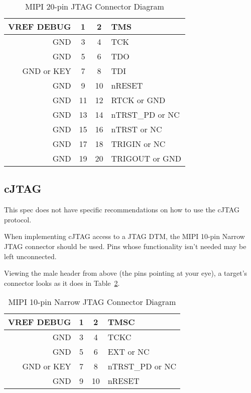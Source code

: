 \begin{table}[H]
    \centering
    \caption{MIPI 20-pin JTAG Connector Diagram}
    \label{tab:mipitwenty}
    \begin{tabular}{|r|c|c|l|}
        \hline
        VREF DEBUG & 1 & 2 & TMS \\
        \hline
        GND & 3 & 4 & TCK \\
        \hline
        GND & 5 & 6 & TDO \\
        \hline
        GND or KEY & 7 & 8 & TDI \\
        \hline
        GND & 9 & 10 & nRESET \\
        \hline
        GND & 11 & 12 & RTCK or GND \\
        \hline
        GND & 13 & 14 & nTRST\_PD or NC \\
        \hline
        GND & 15 & 16 & nTRST or NC \\
        \hline
        GND & 17 & 18 & TRIGIN or NC \\
        \hline
        GND & 19 & 20 & TRIGOUT or GND \\
        \hline
    \end{tabular}
\end{table}

\subsection{cJTAG}

This spec does not have specific recommendations on how to use the cJTAG
protocol.

When implementing cJTAG access to a JTAG DTM, the MIPI 10-pin Narrow JTAG
connector should be used. Pins whose functionality isn't needed may be left
unconnected.

Viewing the male header from above (the pins pointing
at your eye), a target's connector looks as it does in
Table~\ref{tab:mipicjtag}.

\begin{table}[htp]
    \centering
    \caption{MIPI 10-pin Narrow JTAG Connector Diagram}
    \label{tab:mipicjtag}
    \begin{tabular}{|r|c|c|l|}
        \hline
        VREF DEBUG & 1 & 2 & TMSC \\
        \hline
        GND & 3 & 4 & TCKC \\
        \hline
        GND & 5 & 6 & EXT or NC \\
        \hline
        GND or KEY & 7 & 8 & nTRST\_PD or NC \\
        \hline
        GND & 9 & 10 & nRESET \\
        \hline
    \end{tabular}
\end{table}
